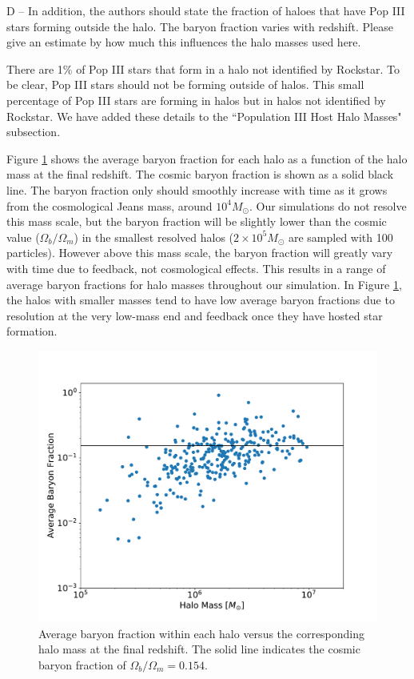 \documentclass[11pt]{article}
\newenvironment{referee}[1][]{%
    \ignorespaces%
    \begin{mdframed}[style=myquotestyle,#1]%
}{%
    \end{mdframed}%
    \ignorespacesafterend%
}%
\begin{document}
\begin{referee}
D -- In addition, the authors should state the fraction of haloes that have Pop III stars forming outside the halo. The baryon fraction varies with redshift. Please give an estimate by how much this influences the halo masses used here.
\end{referee}

There are 1\% of Pop III stars that form in a halo not identified by Rockstar.  To be clear, Pop III stars should not be forming outside of halos. This small percentage of Pop III stars are forming in halos but in halos not identified by Rockstar.  We have added these details to the ``Population III Host Halo Masses" subsection.


Figure \ref{fig:avg_baryon_fraction} shows the average baryon fraction for each halo as a function of the halo mass at the final redshift. The cosmic baryon fraction is shown as a solid black line. The baryon fraction only should smoothly increase with time as it grows from the cosmological Jeans mass, around $10^{4} M_{\odot}$.  Our simulations do not resolve this mass scale, but the baryon fraction will be slightly lower than the cosmic value ($\Omega_b/\Omega_m$) in the smallest resolved halos ($2 \times 10^5 M_\odot$ are sampled with 100 particles).  However above this mass scale, the baryon fraction will greatly vary with time due to feedback, not cosmological effects. This results in a range of average baryon fractions for halo masses throughout our simulation. In Figure \ref{fig:avg_baryon_fraction}, the halos with smaller masses tend to have low average baryon fractions due to resolution at the very low-mass end and feedback once they have hosted star formation.

\begin{figure}[ht!]
  \centering
  \includegraphics[keepaspectratio=true, scale=0.4]{images/avg_baryon_fraction.pdf}
  \caption{\label{fig:avg_baryon_fraction} Average baryon fraction within each halo versus the corresponding halo mass at the final redshift. The solid line indicates the cosmic baryon fraction of $\Omega_b / \Omega_m = 0.154$.}
\end{figure}
\end{document}
